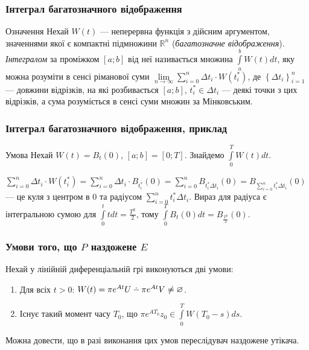 \documentclass[10pt,pdf,aspectratio=169]{beamer}
\newcommand{\R}{\mathbb{R}}
\renewcommand{\l}{\left}
\renewcommand{\r}{\right}
\newcommand{\intl}{\int\limits}
\newcommand{\suml}{\sum\limits}
\def\setdif{\mathbin{\ooalign{\hss\raise1ex\hbox{.}\hss\cr
  \mathsurround=0pt$-$}}}
\begin{document}
    \begin{frame}
        \frametitle{Інтеграл багатозначного відображення}
    
        \begin{block}{Означення}
            Нехай $W(t)$ --- неперервна функція з дійсним аргументом, значеннями якої
        є компактні підмножини $\R^n$ (\emph{багатозначне відображення}).
        \emph{Інтегралом} за проміжком $[a;b]$ від неї називається множина
        $\intl_a^b W(t) dt$, яку можна розуміти в сенсі ріманової суми
        $\underset{n\to\infty}{\lim} \suml_{i=0}^n \Delta t_i\cdot W(t_i^*)$,
        де $\l\{\Delta t_i\r\}_{i=1}^n$ --- довжини відрізків, на які розбивається $[a;b]$, $t_i^* \in \Delta t_i$ ---
        деякі точки з цих відрізків, а сума розуміється в сенсі суми множин за Мінковським.
            \end{block}
    
    \end{frame}
    \begin{frame}
        \frametitle{Інтеграл багатозначного відображення, приклад}
        \begin{block}{Умова}
            Нехай $W(t) = B_t(0)$, $[a;b] = [0; T]$. Знайдемо 
            $\intl_0^T W(t) dt$.
        \end{block}
        $\suml_{i=0}^n \Delta t_i\cdot W(t_i^*) = \suml_{i=0}^n \Delta t_i\cdot B_{t_i^*}(0) = 
        \suml_{i=0}^n B_{t_i^* \Delta t_i}(0) = B_{\suml_{i=0}^n t_i^* \Delta t_i} (0)$ --- це
        куля з центром в $0$ та радіусом $\suml_{i=0}^n t_i^* \Delta t_i$. Вираз для радіуса
        є інтегральною сумою для $\intl_0^t t dt = \frac{T^2}{2}$, тому
        $\intl_0^T B_t(0) dt = B_{\frac{T^2}{2}} (0)$.
    \end{frame}
    \begin{frame}
        \frametitle{Умови того, що $P$ наздожене $E$}
    
        Нехай у лінійній диференціальній грі виконуються дві умови:
        \begin{enumerate}
            \item Для всіх $t>0$: $W(t) = \pi e^{At}U \setdif \pi e^{At}V \neq \varnothing$.
            \item Існує такий момент часу $T_0$, що $\pi e^{AT_0}z_0 \in \intl_0^T W(T_0 - s)ds$.
        \end{enumerate}

        Можна довести, що в разі виконання цих умов переслідувач наздожене утікача.
    \end{frame}
\end{document}
